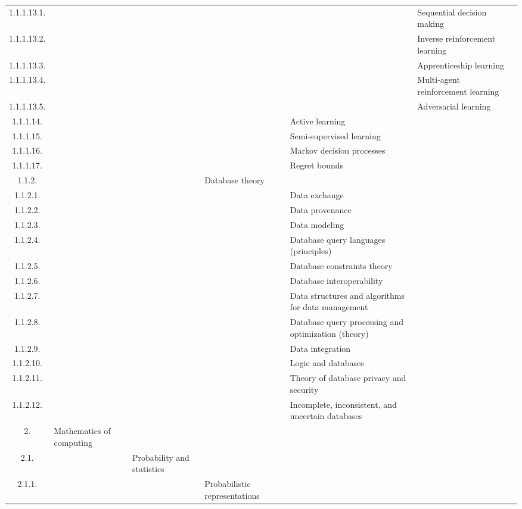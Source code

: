 \documentclass[12pt]{article}
\begin{document}
\begin{center}
{\begin{tabularx}{\linewidth}{|c|X|X|X|X|X|X|}
		1.1.1.13.1. &   &   &   &   &  Sequential decision making &   \\
		1.1.1.13.2. &   &   &   &   &  Inverse reinforcement learning &   \\
		1.1.1.13.3. &   &   &   &   &  Apprenticeship learning &   \\
		1.1.1.13.4. &   &   &   &   &  Multi-agent reinforcement learning &   \\
		1.1.1.13.5. &   &   &   &   &  Adversarial learning &   \\
		1.1.1.14. &   &   &   &  Active learning &   &   \\
		1.1.1.15. &   &   &   &  Semi-supervised learning &   &   \\
		1.1.1.16. &   &   &   &  Markov decision processes &   &   \\
		1.1.1.17. &   &   &   &  Regret bounds &   &   \\
		1.1.2. &   &   &  Database theory &   &   &   \\
		1.1.2.1. &   &   &   &  Data exchange &   &   \\
		1.1.2.2. &   &   &   &  Data provenance &   &   \\
		1.1.2.3. &   &   &   &  Data modeling &   &   \\
		1.1.2.4. &   &   &   &  Database query languages (principles) &   &   \\
		1.1.2.5. &   &   &   &  Database constraints theory &   &   \\
		1.1.2.6. &   &   &   &  Database interoperability &   &   \\
		1.1.2.7. &   &   &   &  Data structures and algorithms for data management &   &   \\
		1.1.2.8. &   &   &   &  Database query processing and optimization (theory) &   &   \\
		1.1.2.9. &   &   &   &  Data integration &   &   \\
		1.1.2.10. &   &   &   &  Logic and databases &   &   \\
		1.1.2.11. &   &   &   &  Theory of database privacy and security &   &   \\
		1.1.2.12. &   &   &   &  Incomplete, inconsistent, and uncertain databases &   &   \\
		2. &  Mathematics of computing &   &   &   &   &   \\
		2.1. &   &  Probability and statistics &   &   &   &   \\
		2.1.1. &   &   &  Probabilistic representations &   &   &   \\

\end{tabularx}}
\end{center}
\end{document}
